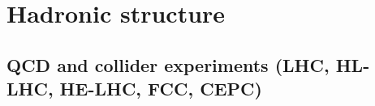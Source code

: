 \section{Hadronic structure}





\subsection{QCD and collider experiments (LHC, HL-LHC, HE-LHC, FCC, CEPC)}


